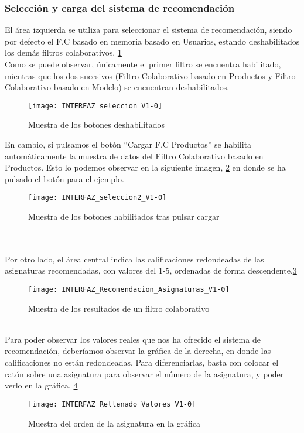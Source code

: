 \subsubsection{Selección y carga del sistema de recomendación}
El área izquierda se utiliza para seleccionar el sistema de recomendación, siendo por defecto el F.C basado en memoria basado en Usuarios, estando deshabilitados los demás filtros colaborativos. \ref{fig:E.2.7} \\Como se puede observar, únicamente el primer filtro se encuentra habilitado, mientras que los dos sucesivos (Filtro Colaborativo basado en Productos y  Filtro Colaborativo basado en Modelo) se encuentran deshabilitados. 
\begin{figure}[h]
\centering
\texttt{[image: INTERFAZ\_seleccion\_V1-0]}
\caption{Muestra de los botones deshabilitados}
\label{fig:E.2.7}
\end{figure}
En cambio, si pulsamos el botón ``Cargar F.C Productos'' se habilita automáticamente la muestra de datos del Filtro Colaborativo basado en Productos. Esto lo podemos observar en la siguiente imagen, \ref{fig:E.2.8} en donde se ha pulsado el botón para el ejemplo. 
\begin{figure}[h]
\centering
\texttt{[image: INTERFAZ\_seleccion2\_V1-0]}
\caption{Muestra de los botones habilitados tras pulsar cargar}
\label{fig:E.2.8}
\end{figure}
\\
\\Por otro lado, el área central indica las calificaciones redondeadas de las asignaturas recomendadas, con valores del 1-5, ordenadas de forma descendente.\ref{fig:E.2.9} 
\begin{figure}[h]
\centering
\texttt{[image: INTERFAZ\_Recomendacion\_Asignaturas\_V1-0]}
\caption{Muestra de los resultados de un filtro colaborativo}
\label{fig:E.2.9}
\end{figure}
\\Para poder observar los valores reales que nos ha ofrecido el sistema de recomendación, deberíamos observar la gráfica de la derecha, en donde las calificaciones no están redondeadas. Para diferenciarlas, basta con colocar el ratón sobre una asignatura para observar el número de la asignatura, y poder verlo en la gráfica. \ref{fig:E.2.10} 
\begin{figure}[h]
\centering
\texttt{[image: INTERFAZ\_Rellenado\_Valores\_V1-0]}
\caption{Muestra del orden de la asignatura en la gráfica}
\label{fig:E.2.10}
\end{figure}
